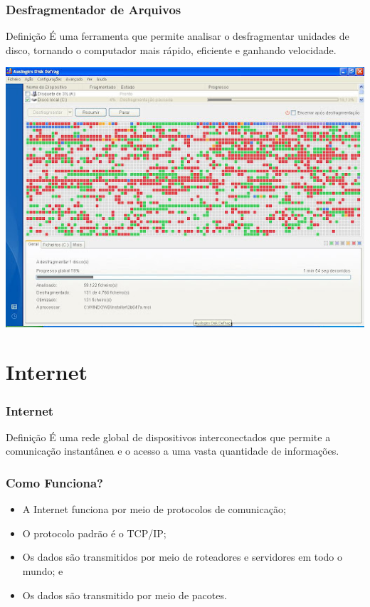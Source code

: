 \documentclass[aspectratio=169]{beamer} %
\begin{document}
\begin{frame}
	\frametitle{Desfragmentador de Arquivos}
	
	\begin{block}{Defini\c cão}
		É uma ferramenta que permite analisar o desfragmentar unidades de disco, tornando o computador mais rápido, eficiente e ganhando velocidade.
	\end{block}\vfill
	
	\begin{center}
		\includegraphics[scale=0.4]{img/desfragmentador}
	\end{center}
\end{frame}

\section{Internet}

\begin{frame}
	\frametitle{Internet}
	
	\begin{block}{Defini\c cão}
		É uma rede global de dispositivos interconectados que permite a comunicação instantânea e o acesso a uma vasta quantidade de informações.
	\end{block}
\end{frame}

\begin{frame}
	\frametitle{Como Funciona?}
	
	\begin{itemize}
		\item A Internet funciona por meio de protocolos de comunicação;
		\item O protocolo padrão é o TCP/IP;
		\item Os dados são transmitidos por meio de roteadores e servidores em todo o mundo; e
		\item Os dados são transmitido por meio de pacotes.
	\end{itemize}
\end{frame}
\end{document}
